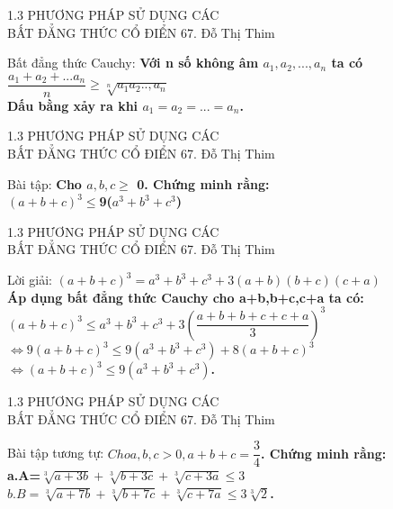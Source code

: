 \begin{frame}{1.3 PHƯƠNG PHÁP SỬ DỤNG CÁC \\ BẤT ĐẲNG THỨC CỔ ĐIỂN \hspace{4.5cm}  67. Đỗ Thị Thim} 
\begin{block}{Bất đẳng thức Cauchy:}
\textbf{Với n số không âm $a_1,a_2,...,a_n$ ta có $\dfrac{a_1+a_2+...a_n}{n}\geq\sqrt[n]{a_1a_2..,a_n}$\\Dấu bằng xảy ra khi $a_1=a_2=...=a_n$.}
\end{block} 
\end{frame} 

\begin{frame}{1.3 PHƯƠNG PHÁP SỬ DỤNG CÁC \\ BẤT ĐẲNG THỨC CỔ ĐIỂN \hspace{4.5cm}  67. Đỗ Thị Thim} 
\begin{block}{Bài tập:}
\textbf{Cho $a,b,c\geq$ 0. Chứng minh rằng:\\$(a+b+c)^3\leq$9($a^3+b^3+c^3$)}
\end{block} 
\end{frame} 

\begin{frame}{1.3 PHƯƠNG PHÁP SỬ DỤNG CÁC \\ BẤT ĐẲNG THỨC CỔ ĐIỂN \hspace{4.5cm}  67. Đỗ Thị Thim} 
\begin{block}{Lời giải:}
\textbf{$(a+b+c)^3=a^3+b^3+c^3+3(a+b)(b+c)(c+a)$\\ Áp dụng bất đẳng thức Cauchy cho a+b,b+c,c+a ta có:\\$(a+b+c)^3\leq a^3+b^3+c^3+3(\dfrac{a+b+b+c+c+a}{3})^3$\\$\Leftrightarrow 9(a+b+c)^3\leq 9(a^3+b^3+c^3)+8(a+b+c)^3$\\$\Leftrightarrow (a+b+c)^3\leq 9(a^3+b^3+c^3)$.}
\end{block}
\end{frame} 

\begin{frame}{1.3 PHƯƠNG PHÁP SỬ DỤNG CÁC \\ BẤT ĐẲNG THỨC CỔ ĐIỂN \hspace{4.5cm}  67. Đỗ Thị Thim} 
\begin{block}{Bài tập tương tự:}
\textbf{$Cho a,b,c>0, a+b+c=\dfrac{3}{4}$. Chứng minh rằng:\\a.A=$\sqrt[3]{a+3b}+\sqrt[3]{b+3c}+\sqrt[3]{c+3a}\leq3$\\$b.B=\sqrt[3]{a+7b}+\sqrt[3]{b+7c}+\sqrt[3]{c+7a}\leq 3\sqrt[3]{2}$.}
\end{block} 
\end{frame} 

